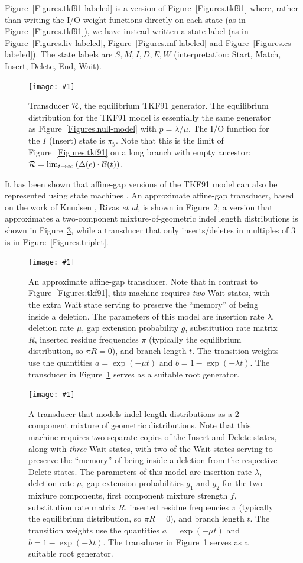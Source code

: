\documentclass{article}
\newcommand{\figref}[1]{Figure~\ref{Figures.#1}}
\newcommand{\figlabel}[1]{\label{Figures.#1}}
\newcommand{\easyfig}[4]{
\begin{figure}
\texttt{[image: \#1]}
\caption{ \figlabel{#3} #4}
\end{figure}}
\newcommand{\widepdffig}[2]{\easyfig{#1-fig.pdf}{width=\textwidth}{#1}{#2}}
\newcommand\tkf{{\cal B}}
\newcommand\tkfroot{{\cal R}}
\newcommand\generate{\Delta}
\begin{document}
\figref{tkf91-labeled} is a version of \figref{tkf91}
where, rather than writing the I/O weight functions directly on each state (as in \figref{tkf91}),
we have instead written a state label (as in \figref{liv-labeled}, \figref{mf-labeled} and \figref{cs-labeled}).
The state labels are $S,M,I,D,E,W$ (interpretation: Start, Match, Insert, Delete, End, Wait).

\widepdffig{tkf91-root}{Transducer $\tkfroot$, the equilibrium TKF91 generator.
The equilibrium distribution for the TKF91 model is essentially the same generator as \figref{null-model} with $p=\lambda/\mu$.
The I/O function for the $I$ (Insert) state is $\pi_y$.
Note that this is the limit of \figref{tkf91} on a long branch with empty ancestor:
$\tkfroot = \lim_{t\to\infty} \left( \generate(\epsilon) \cdot \tkf(t) \right)$.
}

It has been shown that affine-gap versions of the TKF91 model can also be represented using state machines \cite{MiklosLunterHolmes2004}.
An approximate affine-gap transducer, based on the work of Knudsen \cite{KnudsenMiyamoto2003}, Rivas \cite{Rivas05} {\em et al}, is shown in \figref{protpal};
a version that approximates a two-component mixture-of-geometric indel length distributions is shown in \figref{protpal-mix2},
while a transducer that only inserts/deletes in multiples of 3 is in \figref{triplet}.

\widepdffig{protpal}{An approximate affine-gap transducer.
Note that in contrast to \figref{tkf91}, this machine requires {\em two} Wait states,
with the extra Wait state serving to preserve the ``memory'' of being inside a deletion.
The parameters of this model are insertion rate $\lambda$, deletion rate $\mu$, gap extension probability $g$,
substitution rate matrix $R$, inserted residue frequencies $\pi$ (typically the equilibrium distribution, so $\pi R = 0$), and branch length $t$.
The transition weights use the quantities
$a = \exp(-\mu t)$ and $b = 1 - \exp(-\lambda t)$.
The transducer in \figref{tkf91-root} serves as a suitable root generator.
}

\widepdffig{protpal-mix2}{A transducer that models indel length distributions as a 2-component mixture of geometric distributions.
Note that this machine requires
two separate copies of the Insert and Delete states, along with {\em three} Wait states,
with two of the Wait states serving to preserve the ``memory'' of being inside a deletion from the respective Delete states.
The parameters of this model are insertion rate $\lambda$, deletion rate $\mu$, gap extension probabilities $g_1$ and $g_2$ for the two mixture components,
first component mixture strength $f$, substitution rate matrix $R$, inserted residue frequencies $\pi$ (typically the equilibrium distribution, so $\pi R = 0$), and branch length $t$.
The transition weights use the quantities
$a = \exp(-\mu t)$ and $b = 1 - \exp(-\lambda t)$.
The transducer in \figref{tkf91-root} serves as a suitable root generator.
}
\end{document}
